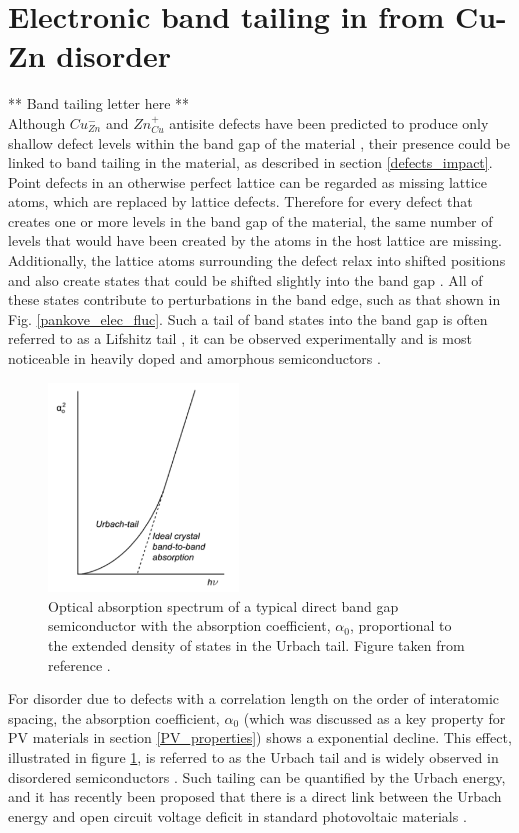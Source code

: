 \documentclass[11pt, twoside]{report}
\begin{document}
\section{Electronic band tailing in {\CZTS} from Cu-Zn disorder}

** Band tailing letter here **\\

Although $Cu_{Zn}^{-}$ and $Zn_{Cu}^{+}$ antisite defects have been predicted to produce only shallow defect levels within the band gap of the material \cite{defects_Chen}, their presence could be linked to band tailing in the material, as described in section \ref{defects_impact}. 
Point defects in an otherwise perfect lattice can be regarded as missing lattice atoms, which are replaced by lattice defects. Therefore for every defect that creates one or more levels in the band gap of the material, the same number of levels that would have been created by the atoms in the host lattice are missing. Additionally, the lattice atoms surrounding the defect relax into shifted positions and also create states that could be shifted slightly into the band gap \cite{thin_film_Boer}. All of these states contribute to perturbations in the band edge, such as that shown in Fig. \ref{pankove_elec_fluc}. Such a tail of band states into the band gap is often referred to as a Lifshitz tail \cite{Lifshitz1964}, it can be observed experimentally and is most noticeable in heavily doped and amorphous semiconductors \cite{thin_film_Boer}. 
\begin{figure}[h!]
  \centering
    \includegraphics[width=0.45\textwidth]{figures/urbach_fig.png}
    \caption{Optical absorption spectrum of a typical direct band gap semiconductor with the absorption coefficient, $\alpha_{0}$, proportional to the extended density of states in the Urbach tail. Figure taken from reference .}
  \label{urbach_fig}
\end{figure}
For disorder due to defects with a correlation length on the order of interatomic spacing, the absorption coefficient, $\alpha_{0}$ (which was discussed as a key property for PV materials in section \ref{PV_properties}) shows a exponential decline. This effect, illustrated in figure \ref{urbach_fig}, is referred to as the Urbach tail \cite{Urbach1953} and is widely observed in disordered semiconductors \cite{thin_film_Boer}. Such tailing can be quantified by the Urbach energy, and it has recently been proposed that there is a direct link between the Urbach energy and open circuit voltage deficit in standard photovoltaic materials \cite{culprit, UrbachE_Voc}.
\end{document}
